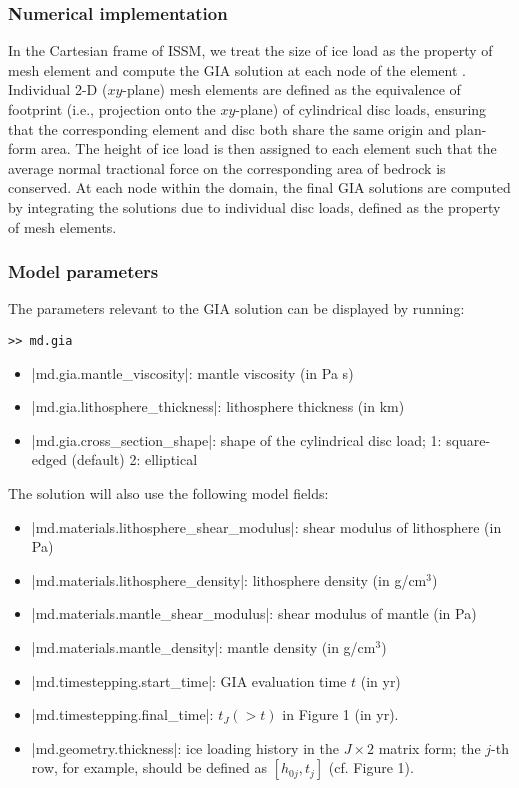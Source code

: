 \subsubsection{Numerical implementation}
In the Cartesian frame of ISSM, we treat the size of ice load as the property of mesh element and compute the GIA solution at each node of the element \citep{Adhikari2014}. Individual 2-D ($xy$-plane) mesh elements are defined as the equivalence of footprint (i.e., projection onto the $xy$-plane) of cylindrical disc loads, ensuring that the corresponding element and disc both share the same origin and plan-form area. The height of ice load is then assigned to each element such that the average normal tractional force on the corresponding area of bedrock is conserved. At each node within the domain, the final GIA solutions are computed by integrating the solutions due to individual disc loads, defined as the property of mesh elements.

\subsubsection{Model parameters}
The parameters relevant to the GIA solution can be displayed by running:
\begin{lstlisting}
>> md.gia
\end{lstlisting}

\begin{itemize}
	\item \lstinlinebg|md.gia.mantle_viscosity|: mantle viscosity (in Pa s)
	\item \lstinlinebg|md.gia.lithosphere_thickness|: lithosphere thickness (in km)
	\item \lstinlinebg|md.gia.cross_section_shape|: shape of the cylindrical disc load; 1: square-edged (default) 2: elliptical
\end{itemize}

The solution will also use the following model fields:
\begin{itemize}
	\item \lstinlinebg|md.materials.lithosphere_shear_modulus|: shear modulus of lithosphere (in Pa)
	\item \lstinlinebg|md.materials.lithosphere_density|: lithosphere density (in g/cm$^3$)
	\item \lstinlinebg|md.materials.mantle_shear_modulus|: shear modulus of mantle (in Pa)
	\item \lstinlinebg|md.materials.mantle_density|: mantle density (in g/cm$^3$)
	\item \lstinlinebg|md.timestepping.start_time|: GIA evaluation time $t$ (in yr)
	\item \lstinlinebg|md.timestepping.final_time|: $t_J(>t)$ in Figure 1 (in yr).
	\item \lstinlinebg|md.geometry.thickness|: ice loading history in the $J \times 2$ matrix form; the $j$-th row, for example, should be defined as $[h_{0j},t_j]$ (cf. Figure 1).
\end{itemize}

